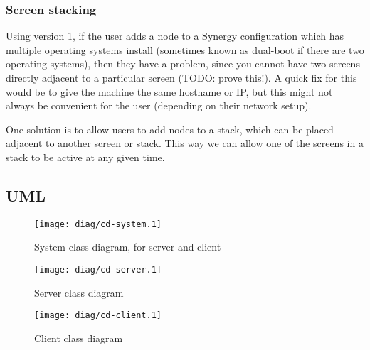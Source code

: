 \subsubsection{Screen stacking}

Using version 1, if the user adds a node to a Synergy configuration which has
multiple operating systems install (sometimes known as dual-boot if there are
two operating systems), then they have a problem, since you cannot have two
screens directly adjacent to a particular screen (TODO: prove this!). A quick
fix for this would be to give the machine the same hostname or IP, but this
might not always be convenient for the user (depending on their network setup).

One solution is to allow users to add nodes to a stack, which can be placed
adjacent to another screen or stack. This way we can allow one of the screens
in a stack to be active at any given time.

\clearpage
\subsection{UML}

\begin{figure}[ht!]
  \begin{center}
    \texttt{[image: diag/cd-system.1]}
    \caption{System class diagram, for server and client}
    \label{fig:systemClassDiagram}
  \end{center}
\end{figure}

\begin{figure}[ht!]
  \begin{center}
    \texttt{[image: diag/cd-server.1]}
    \caption{Server class diagram}
    \label{fig:serverClassDiagram}
  \end{center}
\end{figure}

\begin{figure}[ht!]
  \begin{center}
    \texttt{[image: diag/cd-client.1]}
    \caption{Client class diagram}
    \label{fig:clientClassDiagram}
  \end{center}
\end{figure}

